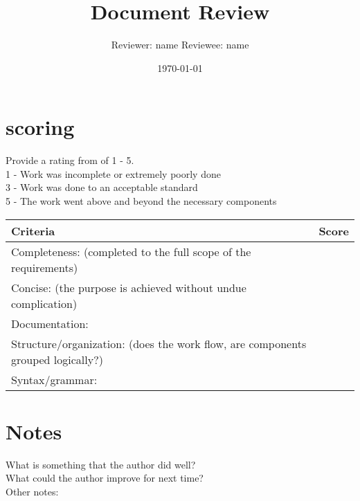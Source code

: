 \documentclass{article}
\title{Document Review}
\author{Reviewer: name Reviewee: name }
\date{\today}
\begin{document}
\maketitle

\section{scoring}
    Provide a rating from of 1 - 5. \\
    1 - Work was incomplete or extremely poorly done\\
    3 - Work was done to an acceptable standard\\
    5 - The work went above and beyond the necessary components\\

\begin{tabular}{|l|c|}
	\hline
	Criteria & Score\\
	\hline
    Completeness:
    (completed to the full scope of the requirements) & \\
	\hline
    Concise:
    (the purpose is achieved without undue complication) & \\
	\hline
    Documentation: & \\
    \hline
    Structure/organization:
    (does the work flow, are components grouped logically?) & \\
    \hline
    Syntax/grammar: & \\
    \hline
\end{tabular}

\section{Notes}
    
    What is something that the author did well?\\
    
    What could the author improve for next time?\\
    
    Other notes:\\
\end{document}
